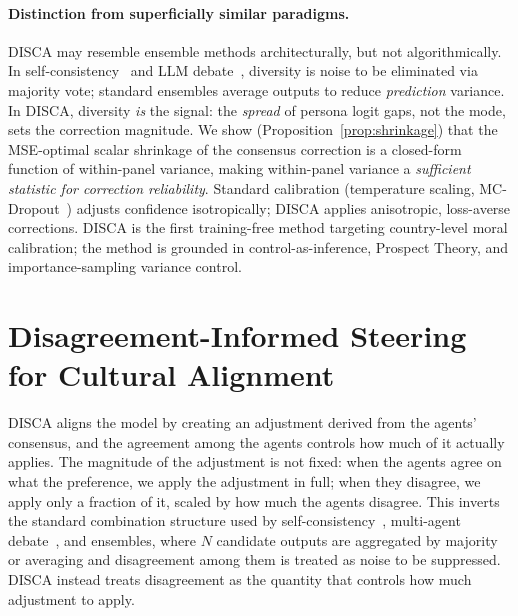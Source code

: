 \documentclass{article}
\begin{document}
\paragraph{Distinction from superficially similar paradigms.}
DISCA may resemble ensemble methods architecturally, but not algorithmically. In self-consistency~\citep{wang2023selfconsistency} and LLM debate~\citep{du2023improving, liang2024encouraging}, diversity is noise to be eliminated via majority vote; standard ensembles average outputs to reduce \emph{prediction} variance. In DISCA, diversity \emph{is} the signal: the \emph{spread} of persona logit gaps, not the mode, sets the correction magnitude. We show (Proposition~\ref{prop:shrinkage}) that the MSE-optimal scalar shrinkage of the consensus correction is a closed-form function of within-panel variance, making within-panel variance a \emph{sufficient statistic for correction reliability}. Standard calibration (temperature scaling, MC-Dropout~\citep{gal2016dropout, kwon2025dropouts}) adjusts confidence isotropically; DISCA applies anisotropic, loss-averse corrections. DISCA is the first training-free method targeting country-level moral calibration; the method is grounded in control-as-inference, Prospect Theory, and importance-sampling variance control.

\vspace{-0.4cm}
\section{Disagreement-Informed Steering for Cultural Alignment}
\label{sec:method}
\vspace{-0.2cm}

DISCA aligns the model by creating an adjustment derived from the 
agents' consensus, and the agreement among the agents controls 
how much of it actually applies. The magnitude of the adjustment 
is not fixed: when the agents agree on what the preference, we apply the adjustment in full; when they 
disagree, we apply only a fraction of it, scaled by how much the 
agents disagree. This inverts the standard combination structure used by 
self-consistency~\citep{wang2023selfconsistency}, multi-agent 
debate~\citep{du2023improving, liang2024encouraging}, and ensembles, 
where $N$ candidate outputs are aggregated by majority or averaging 
and disagreement among them is treated as noise to be suppressed. 
DISCA instead treats disagreement as the quantity that controls how 
much adjustment to apply.
\end{document}
